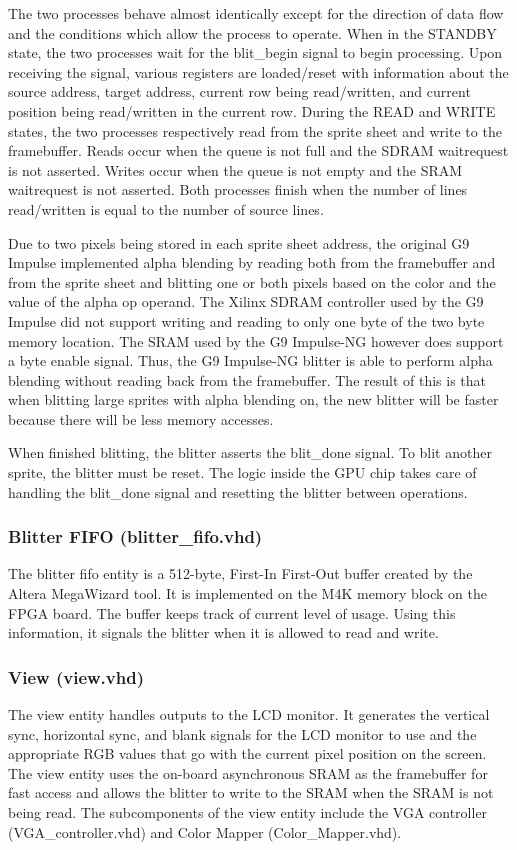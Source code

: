 \documentclass{report}
\begin{document}
The two processes behave almost identically except for the direction of data
flow and the conditions which allow the process to operate. When in the
STANDBY state, the two processes wait for the blit\_begin signal to
begin processing. Upon receiving the signal, various registers are
loaded/reset with information about the source address, target address,
current row being read/written, and current position being read/written
in the current row. During the READ and WRITE states, the two processes
respectively read from the sprite sheet and write to the framebuffer.
Reads occur when the queue is not full and the SDRAM waitrequest is not
asserted. Writes occur when the queue is not empty and the SRAM
waitrequest is not asserted. Both processes finish when the number of
lines read/written is equal to the number of source lines.

Due to two pixels being stored in each sprite sheet address, the
original G9 Impulse implemented alpha blending by reading both from the
framebuffer and from the sprite sheet and blitting one or both pixels
based on the color and the value of the alpha op operand. The Xilinx
SDRAM controller used by the G9 Impulse did not support writing and
reading to only one byte of the two byte memory location. The SRAM used by the G9
Impulse-NG however does support a byte enable signal. Thus, the G9
Impulse-NG blitter is able to perform alpha blending without reading
back from the framebuffer. The result of this is that when blitting large
sprites with alpha blending on, the new blitter will be faster because
there will be less memory accesses.

When finished blitting, the blitter asserts the blit\_done signal. To
blit another sprite, the blitter must be reset. The logic inside the
GPU chip takes care of handling the blit\_done signal and resetting the
blitter between operations.

\subsubsection{Blitter FIFO (blitter\_fifo.vhd)}
The blitter fifo entity is a 512-byte, First-In First-Out buffer created 
by the Altera MegaWizard tool. It is implemented on the M4K memory block 
on the FPGA board. The buffer keeps track of current level of usage. 
Using this information, it signals the blitter when it is allowed to read and
write.

\subsubsection{View (view.vhd)}
The view entity handles outputs to the LCD monitor. It generates the 
vertical sync, horizontal sync, and blank signals for the LCD monitor to 
use and the appropriate RGB values that go with the current pixel 
position on the screen. The view entity uses the on-board asynchronous 
SRAM as the framebuffer for fast access and allows the blitter to write to the SRAM 
when the SRAM is not being read. The subcomponents of the view entity 
include the VGA controller (VGA\_controller.vhd) and Color Mapper 
(Color\_Mapper.vhd).
\end{document}
